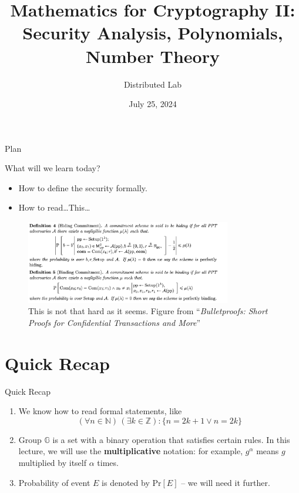 \documentclass{beamer}
\title[Mathematics II]{\textbf{Mathematics for Cryptography II: Security Analysis, Polynomials, Number Theory}}
\author{Distributed Lab}
\date{July 25, 2024}
\begin{document}
    \frame {
      \titlepage
    }
  
    \begin{frame}{Plan}
      \tableofcontents
    \end{frame}

    \begin{frame}{What will we learn today?}
        \begin{itemize}
            \item How to define the security formally.
            \item How to read\ldots This\ldots
        \end{itemize}
        \begin{figure}
            \includegraphics[width=0.8\textwidth]{images/lecture_2/bulletproof.png}
            \caption{This is not that hard as it seems. Figure from ``\textit{Bulletproofs: Short Proofs for Confidential Transactions and More}''}
            \label{fig:wuuttt}
        \end{figure}
    \end{frame}

    \section{Quick Recap}

    \begin{frame}{Quick Recap}
        \begin{enumerate}
            \item We know how to read formal statements, like 
            \begin{equation*}
                (\forall n \in \mathbb{N}) \, (\exists k \in \mathbb{Z}): \{n=2k+1 \vee n = 2k\}
            \end{equation*}
            \item Group $\mathbb{G}$ is a set with a binary operation that satisfies certain rules. In this lecture, we will use the \textbf{multiplicative} notation: for example, $g^{\alpha}$ means $g$ multiplied by itself $\alpha$ times.
            \item Probability of event $E$ is denoted by $\text{Pr}[E]$ -- we will need it further.
        \end{enumerate}
    \end{frame}
\end{document}
